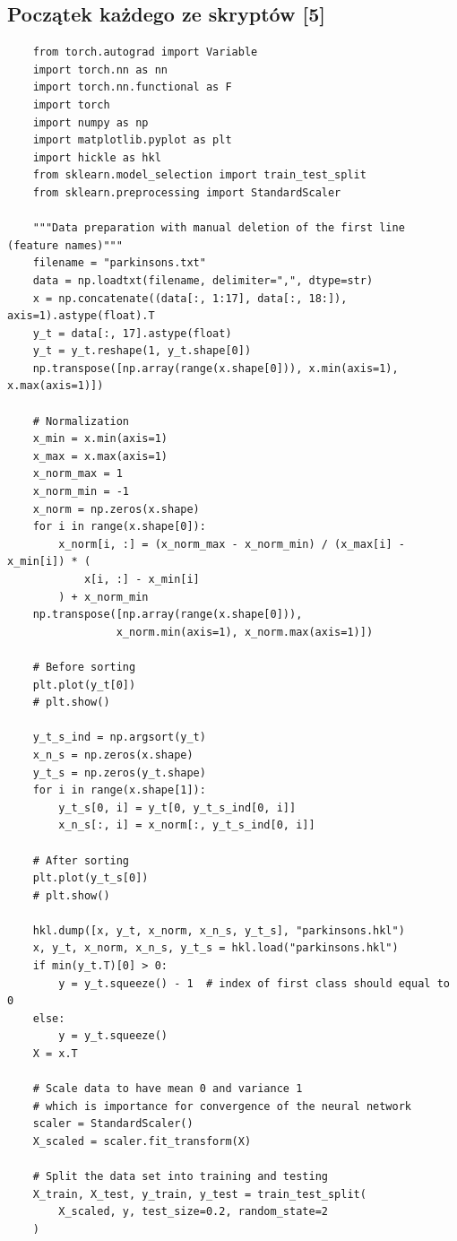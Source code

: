 \documentclass[a4paper]{article}
\begin{document}
\subsection{Początek każdego ze skryptów [5]}
\begin{verbatim}
    from torch.autograd import Variable
    import torch.nn as nn
    import torch.nn.functional as F
    import torch
    import numpy as np
    import matplotlib.pyplot as plt
    import hickle as hkl
    from sklearn.model_selection import train_test_split
    from sklearn.preprocessing import StandardScaler
    
    """Data preparation with manual deletion of the first line (feature names)"""
    filename = "parkinsons.txt"
    data = np.loadtxt(filename, delimiter=",", dtype=str)
    x = np.concatenate((data[:, 1:17], data[:, 18:]), axis=1).astype(float).T
    y_t = data[:, 17].astype(float)
    y_t = y_t.reshape(1, y_t.shape[0])
    np.transpose([np.array(range(x.shape[0])), x.min(axis=1), x.max(axis=1)])
    
    # Normalization
    x_min = x.min(axis=1)
    x_max = x.max(axis=1)
    x_norm_max = 1
    x_norm_min = -1
    x_norm = np.zeros(x.shape)
    for i in range(x.shape[0]):
        x_norm[i, :] = (x_norm_max - x_norm_min) / (x_max[i] - x_min[i]) * (
            x[i, :] - x_min[i]
        ) + x_norm_min
    np.transpose([np.array(range(x.shape[0])),
                 x_norm.min(axis=1), x_norm.max(axis=1)])
    
    # Before sorting
    plt.plot(y_t[0])
    # plt.show()
    
    y_t_s_ind = np.argsort(y_t)
    x_n_s = np.zeros(x.shape)
    y_t_s = np.zeros(y_t.shape)
    for i in range(x.shape[1]):
        y_t_s[0, i] = y_t[0, y_t_s_ind[0, i]]
        x_n_s[:, i] = x_norm[:, y_t_s_ind[0, i]]
    
    # After sorting
    plt.plot(y_t_s[0])
    # plt.show()
    
    hkl.dump([x, y_t, x_norm, x_n_s, y_t_s], "parkinsons.hkl")
    x, y_t, x_norm, x_n_s, y_t_s = hkl.load("parkinsons.hkl")
    if min(y_t.T)[0] > 0:
        y = y_t.squeeze() - 1  # index of first class should equal to 0
    else:
        y = y_t.squeeze()
    X = x.T
    
    # Scale data to have mean 0 and variance 1
    # which is importance for convergence of the neural network
    scaler = StandardScaler()
    X_scaled = scaler.fit_transform(X)
    
    # Split the data set into training and testing
    X_train, X_test, y_train, y_test = train_test_split(
        X_scaled, y, test_size=0.2, random_state=2
    )
\end{verbatim}
\end{document}
